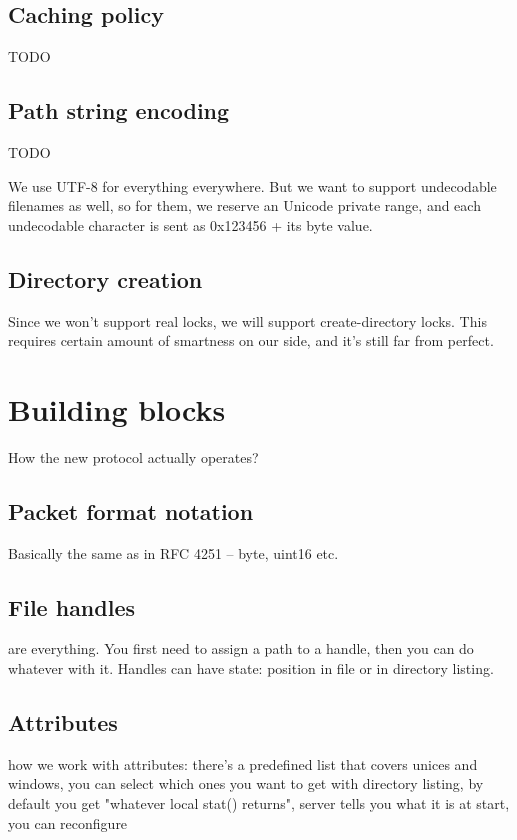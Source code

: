 \subsection{Caching policy}

TODO

\subsection{Path string encoding}

TODO

We use UTF-8 for everything everywhere. But we want to support undecodable filenames as well, so for them, we
reserve an Unicode private range, and each undecodable character is sent as 0x123456 + its byte value.

\subsection{Directory creation}

Since we won't support real locks, we will support create-directory locks. This requires certain amount of
smartness on our side, and it's still far from perfect.


\section{Building blocks}

How the new protocol actually operates?

\subsection{Packet format notation}

Basically the same as in RFC 4251 -- byte, uint16 etc.

\subsection{File handles}

are everything. You first need to assign a path to a handle, then you can do whatever with it. Handles can
have state: position in file or in directory listing.

\subsection{Attributes}

how we work with attributes: there's a predefined list that covers unices and windows, you can select which
ones you want to get with directory listing, by default you get "whatever local stat() returns", server tells
you what it is at start, you can reconfigure

